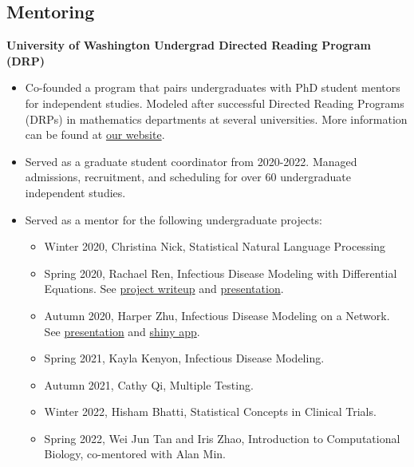 \documentclass[margin, 10pt]{res} %
\begin{document}
\begin{resume}
{\section{Mentoring}
{\textbf{University of Washington Undergrad Directed Reading Program (DRP)}}
\begin{itemize}
  \item Co-founded a program that pairs undergraduates with PhD student mentors for independent studies. Modeled after successful Directed Reading Programs (DRPs) in mathematics departments at several universities. More information can be found at \href{https://spa-drp.github.io}{our website}. 
  \item Served as a graduate student coordinator from 2020-2022. Managed admissions, recruitment, and scheduling for over 60 undergraduate independent studies. 
  \item Served as a mentor for the following undergraduate projects:
  \begin{itemize}
  \item Winter 2020, Christina Nick, Statistical Natural Language Processing
  \item Spring 2020, Rachael Ren, Infectious Disease Modeling with Differential Equations. See \href{https://spa-drp.github.io/writeups/spring2020/rachael.pdf}{project writeup} and \href{https://spa-drp.github.io/writeups/spring2020/rachaelslides.pdf}{presentation}.
  \item Autumn 2020, Harper Zhu, Infectious Disease Modeling on a Network.  See \href{https://spa-drp.github.io/writeups/aut2020/harper-slides.pdf}{presentation} and \href{https://harperzhu.shinyapps.io/DiseaseSimulation/}{shiny app}.
  \item Spring 2021, Kayla Kenyon, Infectious Disease Modeling. 
  \item Autumn 2021, Cathy Qi, Multiple Testing. 
  \item Winter 2022, Hisham Bhatti, Statistical Concepts in Clinical Trials.
 \item Spring 2022, Wei Jun Tan and Iris Zhao, Introduction to Computational Biology, co-mentored with Alan Min. 
 \end{itemize}
 \end{itemize}

}
\end{resume}
\end{document}
